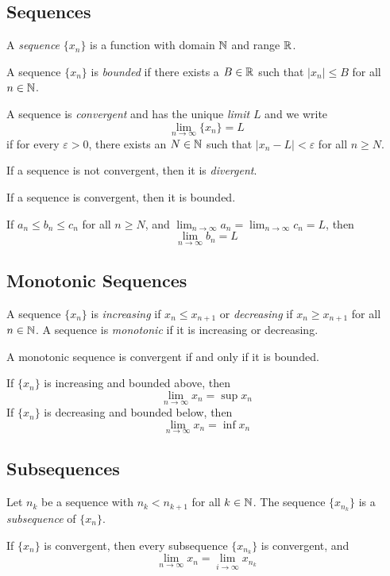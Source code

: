 \documentclass[12pt]{article}
\begin{document}
\subsection{Sequences}
\begin{definition}
    A \textit{sequence} \(\{x_n\}\) is a function with domain \(\mathbb{N}\) and range
    \(\mathbb{R}\).
\end{definition}
\begin{definition}
    A sequence \(\{x_n\}\) is \textit{bounded} if there exists a \(B\in\mathbb{R}\)
    such that \(|x_n|\leq B\) for all \(n\in\mathbb{N}\).
\end{definition}
\begin{definition}
    A sequence is \textit{convergent} and has the unique \textit{limit} \(L\)
    and we write
    \[\lim_{n\to\infty}\{x_n\}=L\]
    if for every \(\varepsilon>0\), there exists an \(N\in\mathbb{N}\) such that
    \(|x_n-L|<\varepsilon\) for all \(n\geq N\).
\end{definition}
If a sequence is not convergent, then it is \textit{divergent}.
\begin{theorem}
    If a sequence is convergent, then it is bounded.
\end{theorem}
\begin{theorem}
    If \(a_n\leq b_n\leq c_n\) for all \(n\geq N\), and
    \(\lim_{n\to\infty}a_n=\lim_{n\to\infty}c_n=L\), then
    \[\lim_{n\to\infty}b_n=L\]
\end{theorem}

\subsection{Monotonic Sequences}
\begin{definition}
    A sequence \(\{x_n\}\) is \textit{increasing} if \(x_n\leq x_{n+1}\) or
    \textit{decreasing} if \(x_n\geq x_{n+1}\) for all \(n\in\mathbb{N}\).
    A sequence is \textit{monotonic} if it is increasing or decreasing.
\end{definition}
\begin{theorem}
    A monotonic sequence is convergent if and only if it is bounded.
\end{theorem}
If \(\{x_n\}\) is increasing and bounded above, then
\[\lim_{n\to\infty}x_n=\sup x_n\]
If \(\{x_n\}\) is decreasing and bounded below, then
\[\lim_{n\to\infty}x_n=\inf x_n\]

\subsection{Subsequences}
\begin{definition}
    Let \(n_k\) be a sequence with \(n_k<n_{k+1}\) for all \(k\in\mathbb{N}\).
    The sequence \(\{x_{n_k}\}\) is a \textit{subsequence} of \(\{x_n\}\).
\end{definition}
\begin{theorem}
    If \(\{x_n\}\) is convergent, then every subsequence \(\{x_{n_k}\}\) is
    convergent, and
    \[\lim_{n\to\infty}x_n=\lim_{i\to\infty}x_{n_k}\]
\end{theorem}
\end{document}
